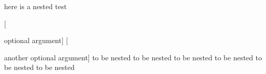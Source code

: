 here is a nested test
\begin{one}

	[

		optional argument]
	[


		another optional argument]
	to be nested to be nested
	to be nested to be nested
	to be nested to be nested
\end{one}
